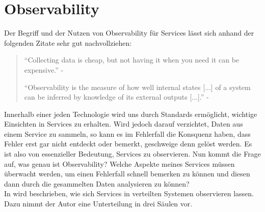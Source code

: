 \section{Observability}

Der Begriff und der Nutzen von Observability für Services lässt sich anhand der folgenden Zitate sehr gut nachvollziehen:

\begin{quote}
	\enquote{Collecting data is cheap, but not having it when you need it can be expensive.}\autocite[S. 373]{microservice_enterprise} - \textit{\citeauthor{microservice_enterprise}}

	\enquote{Observability is the measure of how well internal states [...] of a system can be inferred by knowledge of its external outputs [...].}\autocite[S. 35]{Yordanova2016} - \textit{\citeauthor{Yordanova2016}}
\end{quote}

Innerhalb einer jeden Technologie wird uns durch Standards  ermöglicht, wichtige Einsichten in Services zu erhalten. Wird jedoch darauf verzichtet, Daten aus einem Service zu sammeln, so kann es im Fehlerfall die Konsquenz haben, dass Fehler erst gar nicht entdeckt oder bemerkt, geschweige denn gelöst werden. Es ist also von essenzieller Bedeutung, Services zu observieren. Nun kommt die Frage auf, was genau ist Observability? Welche Aspekte meines Services müssen überwacht werden, um einen Fehlerfall schnell bemerken zu können und diesen dann durch die gesammelten Daten analysieren zu können?\\
In  wird beschrieben, wie sich Services in verteilten Systemen observieren lassen. Dazu nimmt der Autor eine Unterteilung in drei Säulen vor.

